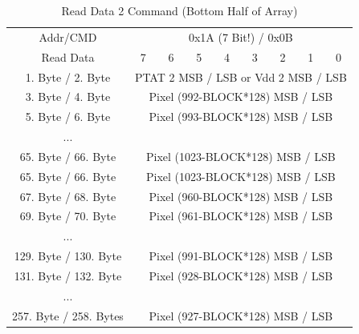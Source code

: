 \documentclass[thesis]{deutez}
\begin{document}
	\begin{table}[h!]
		\begin{center}
			\caption{Read Data 2 Command (Bottom Half of Array)}
			\begin{tabular}{|c|c|c|c|c|c|c|c|c|} 
				\hline
				Addr/CMD & \multicolumn{8}{c|}{0x1A (7 Bit!) / 0x0B}\\\cline{1-9}
				Read Data &7&6&5&4&3&2&1&0\\
				\cline{1-9}
				1. Byte / 2. Byte & \multicolumn{8}{c|}{PTAT 2 MSB / LSB or Vdd 2 MSB / LSB}\\\cline{1-9}
				3. Byte / 4. Byte & \multicolumn{8}{c|}{Pixel (992-BLOCK*128) MSB / LSB}\\\cline{1-9}
				5. Byte / 6. Byte & \multicolumn{8}{c|}{Pixel (993-BLOCK*128) MSB / LSB}\\\cline{1-9}
				... & \multicolumn{8}{c|}{}\\\cline{1-9}	
				65. Byte / 66. Byte & \multicolumn{8}{c|}{Pixel (1023-BLOCK*128) MSB / LSB}\\\cline{1-9}
				
				65. Byte / 66. Byte & \multicolumn{8}{c|}{Pixel (1023-BLOCK*128) MSB / LSB}\\\cline{1-9}
				
				67. Byte / 68. Byte & \multicolumn{8}{c|}{Pixel (960-BLOCK*128) MSB / LSB}\\\cline{1-9}
				
				69. Byte / 70. Byte & \multicolumn{8}{c|}{Pixel (961-BLOCK*128) MSB / LSB}\\\cline{1-9}
				
				... & \multicolumn{8}{c|}{}\\\cline{1-9}
				
				129. Byte / 130. Byte & \multicolumn{8}{c|}{Pixel (991-BLOCK*128) MSB / LSB}\\\cline{1-9}
				
				131. Byte / 132. Byte & \multicolumn{8}{c|}{Pixel (928-BLOCK*128) MSB / LSB}\\\cline{1-9}
				
				...& \multicolumn{8}{c|}{}\\\cline{1-9}
				
				257. Byte / 258. Bytes& \multicolumn{8}{c|}{Pixel (927-BLOCK*128) MSB / LSB}\\\cline{1-9}
				
			\end{tabular}
		\end{center}
	\end{table}
\end{document}
